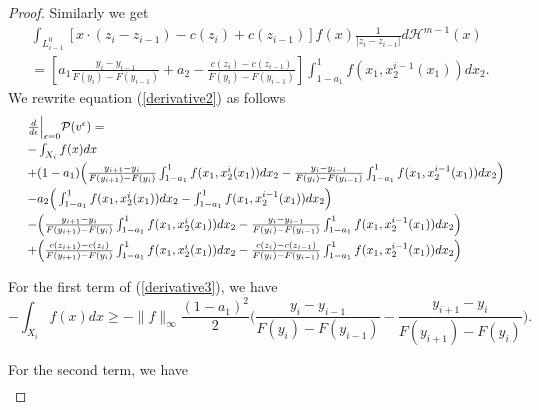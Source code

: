 \documentclass[12pt,reqno]{amsart}
\begin{document}
\begin{proof}
Similarly we get 
\begin{eqnarray*}
\int_{L^0_{i-1}}[x \cdot (z_{i}-z_{i-1})-c(z_i) + c(z_{i-1}) ]f(x)\frac{1}{|z_i-z_{i-1}|}d\mathcal H^{m-1}(x)\\
=[a_1\frac{y_{i} -y_{i-1}}{F(y_{i})-F(y_{i-1})} +a_2  -\frac{c(z_{i}) -c(z_{i-1})}{F(y_{i})-F(y_{i-1})}]\int_{1-a_1}^{1} f(x_1,x^{i-1}_2(x_1))dx_2.
\end{eqnarray*}
We rewrite equation (\ref{derivative2}) as follows
\begin{equation}\label{derivative3}
\begin{array}{ll}
         &\frac{d}{d\epsilon}\Big|_{\epsilon=0} \mathcal P(v^\epsilon)  =\vspace{3pt}\\
         &-\int_{X_i}f(x)dx \vspace{3pt}\\
      &+ (1-a_1)\Big(\frac{y_{i+1} -y_i}{F(y_{i+1})-F(y_i)}
\int_{1-a_1}^{1} f(x_1,x^i_2(x_1))dx_2- \frac{y_{i} -y_{i-1}}{F(y_{i})-F(y_{i-1})}
\int_{1-a_1}^{1} f(x_1,x^{i-1}_2(x_1))dx_2\Big) \vspace{3pt}\\
&-    a_2\Big(\int_{1-a_1}^{1} f(x_1,x^i_2(x_1))dx_2-
\int_{1-a_1}^{1} f(x_1,x^{i-1}_2(x_1))dx_2\Big) \vspace{3pt}\\
&-  \Big(\frac{y_{i+1} -y_i}{F(y_{i+1})-F(y_i)}
\int_{1-a_1}^{1} f(x_1,x^i_2(x_1))dx_2-\frac{y_{i} -y_{i-1}}{F(y_{i})-F(y_{i-1})}
\int_{1-a_1}^{1} f(x_1,x^{i-1}_2(x_1))dx_2\Big)\vspace{3pt}\\
&+ \Big(\frac{c(z_{i+1}) -c(z_{i})}{F(y_{i+1})-F(y_{i})}\int_{1-a_1}^{1} f(x_1,x^i_2(x_1))dx_2
-\frac{c(z_{i}) -c(z_{i-1})}{F(y_{i})-F(y_{i-1})}\int_{1-a_1}^{1} f(x_1,x^{i-1}_2(x_1))dx_2\Big)
\end{array}\end{equation}

For the first term of (\ref{derivative3}), we have 
 \begin{equation}\label{mass bound2}
 -\int_{X_i} f(x)dx\ge - \|f\|_\infty \frac{(1-a_1)^2}{2}\Big(\frac{y_i-y_{i-1}}{F(y_i)-F(y_{i-1})}-\frac{y_{i+1}-y_i}{F(y_{i+1})-F(y_i)}\Big).
 \end{equation}

For the second term, we have 
\[\begin{array}{ll}


\end{array}\]
\end{proof}
\end{document}
